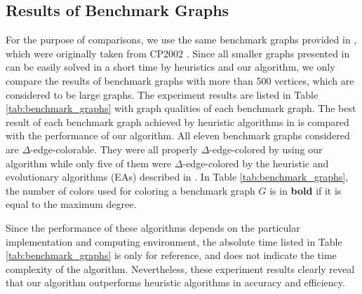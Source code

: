 \documentclass[11pt]{article}
\begin{document}
	
\subsection{Results of Benchmark Graphs}


For the purpose of comparisons, we use the same benchmark graphs provided in \cite{hilgemeier2003fast}, which were originally taken from CP2002 \cite{Johnson2002colorinstances}. Since all smaller graphs presented in \cite{hilgemeier2003fast} can be easily solved in a short time by heuristics and our algorithm, we only compare the results of benchmark graphs with more than 500 vertices, which are considered to be large graphs. The experiment results are listed in Table \ref{tab:benchmark_graphs} with graph qualities of each benchmark graph. The best result of each benchmark graph achieved by heuristic algorithms in \cite{hilgemeier2003fast} is compared with the performance of our algorithm. All eleven benchmark graphs considered are $\Delta$-edge-colorable. They were all properly $\Delta$-edge-colored by using our algorithm while only five of them were $\Delta$-edge-colored by the heuristic and evolutionary algorithms (EAs) described in \cite{hilgemeier2003fast}. In Table \ref{tab:benchmark_graphs}, the number of colors used for coloring a benchmark graph $G$ is in {\bf bold} if it is equal to the maximum degree.

Since the performance of these algorithms depends on the particular implementation and computing environment, the absolute time listed in Table \ref{tab:benchmark_graphs} is only for reference, and does not indicate the time complexity of the algorithm. Nevertheless, these experiment results clearly reveal that our algorithm outperforms heuristic algorithms in accuracy and efficiency.
\end{document}
